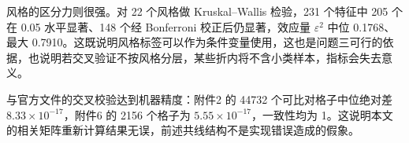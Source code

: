 风格的区分力则很强。对 22 个风格做 Kruskal--Wallis 检验，231 个特征中 205 个在 0.05 水平显著、148 个经 Bonferroni 校正后仍显著，效应量 $\varepsilon^2$ 中位 0.1768、最大 0.7910。这既说明风格标签可以作为条件变量使用，这也是问题三可行的依据，也说明若交叉验证不按风格分层，某些折内将不含小类样本，指标会失去意义。

与官方文件的交叉校验达到机器精度：附件2 的 44732 个可比对格子中位绝对差 $8.33\times10^{-17}$，附件6 的 2156 个格子为 $5.55\times10^{-17}$，一致性均为 1。这说明本文的相关矩阵重新计算结果无误，前述共线结构不是实现错误造成的假象。
